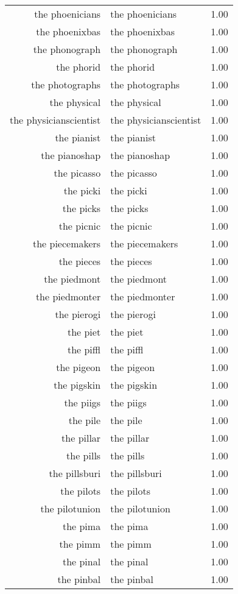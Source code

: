 \begin{table}[ht]
\begin{tabular}{rlr}
  the phoenicians & the phoenicians & 1.00 \\ 
  the phoenixbas & the phoenixbas & 1.00 \\ 
  the phonograph & the phonograph & 1.00 \\ 
  the phorid & the phorid & 1.00 \\ 
  the photographs & the photographs & 1.00 \\ 
  the physical & the physical & 1.00 \\ 
  the physicianscientist & the physicianscientist & 1.00 \\ 
  the pianist & the pianist & 1.00 \\ 
  the pianoshap & the pianoshap & 1.00 \\ 
  the picasso & the picasso & 1.00 \\ 
  the picki & the picki & 1.00 \\ 
  the picks & the picks & 1.00 \\ 
  the picnic & the picnic & 1.00 \\ 
  the piecemakers & the piecemakers & 1.00 \\ 
  the pieces & the pieces & 1.00 \\ 
  the piedmont & the piedmont & 1.00 \\ 
  the piedmonter & the piedmonter & 1.00 \\ 
  the pierogi & the pierogi & 1.00 \\ 
  the piet & the piet & 1.00 \\ 
  the piffl & the piffl & 1.00 \\ 
  the pigeon & the pigeon & 1.00 \\ 
  the pigskin & the pigskin & 1.00 \\ 
  the piigs & the piigs & 1.00 \\ 
  the pile & the pile & 1.00 \\ 
  the pillar & the pillar & 1.00 \\ 
  the pills & the pills & 1.00 \\ 
  the pillsburi & the pillsburi & 1.00 \\ 
  the pilots & the pilots & 1.00 \\ 
  the pilotunion & the pilotunion & 1.00 \\ 
  the pima & the pima & 1.00 \\ 
  the pimm & the pimm & 1.00 \\ 
  the pinal & the pinal & 1.00 \\ 
  the pinbal & the pinbal & 1.00 \\ 

\end{tabular}
\end{table}
